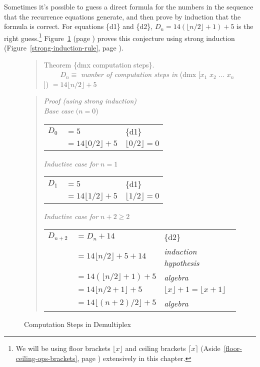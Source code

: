 Sometimes it's possible to guess a direct formula for the numbers in the
sequence that the recurrence equations generate,
and then prove by induction
that the formula is correct.
For equations \{d1\} and \{d2\},
$D_{n} = 14(\lfloor n/2\rfloor + 1) + 5$ is the right guess.\footnote{We
will be using floor brackets $\lfloor x\rfloor$ and ceiling brackets $\lceil x\rceil$
(Aside~\ref{floor-ceiling-ops-brackets}, page \pageref{floor-ceiling-ops-brackets})
extensively in this chapter.}
Figure~\ref{fig:dmx-computation-time}
(page \pageref{fig:dmx-computation-time}) proves
this conjecture using strong induction
(Figure~\ref{strong-induction-rule}, page \pageref{strong-induction-rule}).

\begin{figure}
\begin{quote}
Theorem \{dmx computation steps\}. \\
~~~~ $D_n \equiv$ \emph{number of computation steps in} (dmx [$x_1$ $x_2$ $\dots$ $x_n$]) $= 14\lfloor n/2\rfloor + 5$
\end{quote}
\begin{quote}
\emph{Proof (using strong induction)} \\
\emph{Base case} $(n=0$) \\
\begin{tabular}{lll}
$D_{0}$&$= 5$                        & \{d1\} \\
       &$= 14\lfloor 0/2\rfloor + 5$ & $\lfloor 0/2\rfloor=0$ \\
\end{tabular}

\emph{Inductive case for} $n=1$\\
\begin{tabular}{lll}
$D_{1}$&$= 5$                        & \{d1\} \\
       &$= 14\lfloor 1/2\rfloor + 5$ & $\lfloor 1/2\rfloor=0$ \\
\end{tabular}

\emph{Inductive case for} $n+2 \geq 2$\\
\begin{tabular}{lll}
$D_{n+2}$ &$= D_n + 14$                      & \{d2\} \\
          &$= 14\lfloor n/2\rfloor + 5 + 14$ & \emph{induction hypothesis} \\
          &$= 14(\lfloor n/2\rfloor + 1) + 5$& \emph{algebra} \\
          &$= 14\lfloor n/2 + 1\rfloor + 5$  & $\lfloor x\rfloor + 1 = \lfloor x+1\rfloor$ \\
          &$= 14\lfloor(n+2)/2\rfloor + 5$   & \emph{algebra} \\
\end{tabular}
\end{quote}
\caption{Computation Steps in Demultiplex}
\label{fig:dmx-computation-time}
\end{figure}

